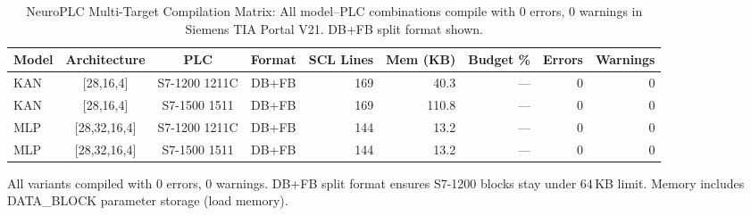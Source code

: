 \begin{table}[t]
\centering
\caption{NeuroPLC Multi-Target Compilation Matrix: All model--PLC combinations compile with 0 errors, 0 warnings in Siemens TIA Portal V21. DB+FB split format shown.}
\label{tab:tia_multitarget}
\small
\begin{tabular}{@{}lcccrrrrr@{}}
\toprule
\textbf{Model} & \textbf{Architecture} & \textbf{PLC} & \textbf{Format} & \textbf{SCL Lines} & \textbf{Mem (KB)} & \textbf{Budget \%} & \textbf{Errors} & \textbf{Warnings} \\
\midrule
  KAN & [28,16,4] & S7-1200 1211C & DB+FB & 169 & 40.3 & --- & 0 & 0 \\
  KAN & [28,16,4] & S7-1500 1511 & DB+FB & 169 & 110.8 & --- & 0 & 0 \\
  MLP & [28,32,16,4] & S7-1200 1211C & DB+FB & 144 & 13.2 & --- & 0 & 0 \\
  MLP & [28,32,16,4] & S7-1500 1511 & DB+FB & 144 & 13.2 & --- & 0 & 0 \\
\bottomrule
\end{tabular}
\vspace{2pt}
{\scriptsize All variants compiled with 0 errors, 0 warnings. DB+FB split format ensures S7-1200 blocks stay under 64\,KB limit. Memory includes DATA\_BLOCK parameter storage (load memory).}
\end{table}
